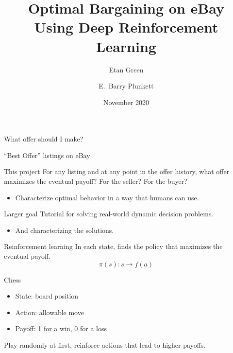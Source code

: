 \documentclass[aspectratio=169]{beamer}
\title{Optimal Bargaining on eBay\\Using Deep Reinforcement Learning}
\author[Green, Plunkett]{Etan Green\inst{1} \and E.~Barry Plunkett\inst{1,2}}
\institute{
  \inst{1}{University of Pennsylvania}
  \and
  \inst{2}{D.~E.~Shaw}
}
\date{November 2020}
\begin{document}
\frame{\titlepage}

\begin{frame}
	What offer should I make?
\end{frame}

\begin{frame}{``Best Offer'' listings on eBay}

\end{frame}

\begin{frame}{This project}
	For any listing and at any point in the offer history, what offer maximizes the eventual payoff? For the seller? For the buyer?
	\begin{itemize}
		\item Characterize optimal behavior in a way that humans can use.
	\end{itemize}
\end{frame}

%

\begin{frame}{Larger goal}
	Tutorial for solving real-world dynamic decision problems.
	\begin{itemize}
		\item And characterizing the solutions.
	\end{itemize}
\end{frame}

\begin{frame}{Reinforcement learning}
	In each state, finds the policy that maximizes the eventual payoff.
	$$\pi(s): s \rightarrow f(a)$$
\end{frame}

\begin{frame}{Chess}
	\begin{itemize}
		\item State: board position
		\item Action: allowable move
		\item Payoff: 1 for a win, 0 for a loss
	\end{itemize}
	\vspace{5mm}
	Play randomly at first, reinforce actions that lead to higher payoffs.
\end{frame}
\end{document}
